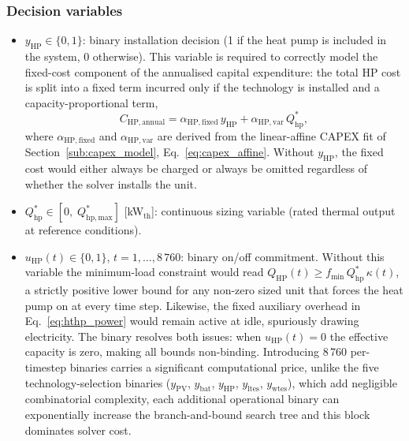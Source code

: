 \documentclass[11pt,a4paper]{report}
\begin{document}
\subsubsection{Decision variables}
\label{sub:hthp_vars}

\begin{itemize}

    \item $y_\mathrm{HP} \in \{0,1\}$: binary installation decision (1 if the heat pump
          is included in the system, 0 otherwise).
          This variable is required to correctly model the fixed-cost component of the
          annualised capital expenditure: the total HP cost is split into a fixed term
          incurred only if the technology is installed and a capacity-proportional term,
          \begin{equation}
              C_\mathrm{HP,annual} = \alpha_\mathrm{HP,fixed}\,y_\mathrm{HP}
                                   + \alpha_\mathrm{HP,var}\,Q_\mathrm{hp}^{*},
              \label{eq:hthp_capex}
          \end{equation}
          where $\alpha_\mathrm{HP,fixed}$ and $\alpha_\mathrm{HP,var}$ are derived
          from the linear-affine CAPEX fit of Section~\ref{sub:capex_model},
          Eq.~\eqref{eq:capex_affine}.
          Without $y_\mathrm{HP}$, the fixed cost would either always be charged or
          always be omitted regardless of whether the solver installs the unit.

    \item $Q_\mathrm{hp}^{*} \in [0,\; Q_\mathrm{hp,max}^{*}]$ [kW$_\mathrm{th}$]:
          continuous sizing variable (rated thermal output at reference conditions).

    \item $u_\mathrm{HP}(t) \in \{0,1\}$, $t=1,\ldots,8\,760$: binary on/off
          commitment.
          Without this variable the minimum-load constraint would read
          $Q_\mathrm{HP}(t) \geq f_\mathrm{min}\,Q_\mathrm{hp}^{*}\,\kappa(t)$,
          a strictly positive lower bound for any non-zero sized unit that forces
          the heat pump on at every time step.
          Likewise, the fixed auxiliary overhead in Eq.~\eqref{eq:hthp_power} would
          remain active at idle, spuriously drawing electricity.
          The binary resolves both issues: when $u_\mathrm{HP}(t)=0$ the effective
          capacity is zero, making all bounds non-binding.
          Introducing 8\,760 per-timestep binaries carries a significant computational
          price, unlike the five technology-selection binaries
          ($y_\mathrm{PV}$, $y_\mathrm{bat}$, $y_\mathrm{HP}$, $y_\mathrm{ltes}$,
          $y_\mathrm{wtes}$), which add negligible combinatorial complexity, each
          additional operational binary can exponentially increase the branch-and-bound
          search tree and this block dominates solver cost.


\end{itemize}
\end{document}
